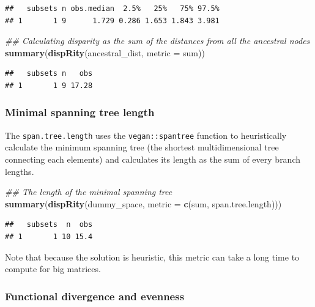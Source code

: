 \documentclass[
]{book}
\newenvironment{Shaded}{\begin{snugshade}}{\end{snugshade}}
\newcommand{\CommentTok}[1]{\textcolor[rgb]{0.56,0.35,0.01}{\textit{#1}}}
\newcommand{\DataTypeTok}[1]{\textcolor[rgb]{0.13,0.29,0.53}{#1}}
\newcommand{\KeywordTok}[1]{\textcolor[rgb]{0.13,0.29,0.53}{\textbf{#1}}}
\newcommand{\NormalTok}[1]{#1}
\begin{document}
\begin{verbatim}
##   subsets n obs.median  2.5%   25%   75% 97.5%
## 1       1 9      1.729 0.286 1.653 1.843 3.981
\end{verbatim}

\begin{Shaded}
\begin{Highlighting}[]
\CommentTok{\#\# Calculating disparity as the sum of the distances from all the ancestral nodes}
\KeywordTok{summary}\NormalTok{(}\KeywordTok{dispRity}\NormalTok{(ancestral\_dist, }\DataTypeTok{metric =}\NormalTok{ sum))}
\end{Highlighting}
\end{Shaded}

\begin{verbatim}
##   subsets n   obs
## 1       1 9 17.28
\end{verbatim}

\hypertarget{minimal-spanning-tree-length}{%
\subsubsection{Minimal spanning tree length}\label{minimal-spanning-tree-length}}

The \texttt{span.tree.length} uses the \texttt{vegan::spantree} function to heuristically calculate the minimum spanning tree (the shortest multidimensional tree connecting each elements) and calculates its length as the sum of every branch lengths.

\begin{Shaded}
\begin{Highlighting}[]
\CommentTok{\#\# The length of the minimal spanning tree}
\KeywordTok{summary}\NormalTok{(}\KeywordTok{dispRity}\NormalTok{(dummy\_space, }\DataTypeTok{metric =} \KeywordTok{c}\NormalTok{(sum, span.tree.length)))}
\end{Highlighting}
\end{Shaded}

\begin{verbatim}
##   subsets  n  obs
## 1       1 10 15.4
\end{verbatim}

Note that because the solution is heuristic, this metric can take a long time to compute for big matrices.

\hypertarget{functional-divergence-and-evenness}{%
\subsubsection{Functional divergence and evenness}\label{functional-divergence-and-evenness}}
\end{document}
